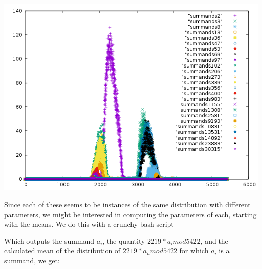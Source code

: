 \documentclass{article}
\theoremstyle{definition}
\theoremstyle{remark}
\numberwithin{equation}{section}
\begin{document}
\includegraphics[scale=0.5]{../figs/summands_mod_5422.png}

Since each of these seems to be instances of the same distribution
with different parameters, we might be interested in computing the
parameters of each, starting with the means.  We do this with a crunchy bash script




Which outputs the summand $a_i$, the quantity $2219*a_i mod 5422$,
and the calculated mean of the distribution of $2219*a_n mod 5422$ for
which $a_i$ is a summand, we get:
\end{document}
